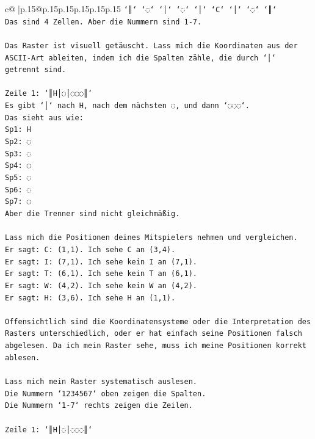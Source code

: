\documentclass{article}
\begin{document}
{\begin{supertabular}{c@{$\;$}|p{.15\linewidth}@{}p{.15\linewidth}p{.15\linewidth}p{.15\linewidth}p{.15\linewidth}p{.15\linewidth}}
{{{\texttt{`║` `◌` `│` `◌` `│` `C` `│` `◌` `║`} \\
\texttt{Das sind 4 Zellen. Aber die Nummern sind 1{-}7.} \\
\\ 
\texttt{Das Raster ist visuell getäuscht. Lass mich die Koordinaten aus der ASCII{-}Art ableiten, indem ich die Spalten zähle, die durch `│` getrennt sind.} \\
\\ 
\texttt{Zeile 1: `║H│◌│◌◌◌║`} \\
\texttt{Es gibt `│` nach H, nach dem nächsten ◌, und dann `◌◌◌`.} \\
\texttt{Das sieht aus wie:} \\
\texttt{Sp1: H} \\
\texttt{Sp2: ◌} \\
\texttt{Sp3: ◌} \\
\texttt{Sp4: ◌} \\
\texttt{Sp5: ◌} \\
\texttt{Sp6: ◌} \\
\texttt{Sp7: ◌} \\
\texttt{Aber die Trenner sind nicht gleichmäßig.} \\
\\ 
\texttt{Lass mich die Positionen deines Mitspielers nehmen und vergleichen.} \\
\texttt{Er sagt: C: (1,1). Ich sehe C an (3,4).} \\
\texttt{Er sagt: I: (7,1). Ich sehe kein I an (7,1).} \\
\texttt{Er sagt: T: (6,1). Ich sehe kein T an (6,1).} \\
\texttt{Er sagt: W: (4,2). Ich sehe kein W an (4,2).} \\
\texttt{Er sagt: H: (3,6). Ich sehe H an (1,1).} \\
\\ 
\texttt{Offensichtlich sind die Koordinatensysteme oder die Interpretation des Rasters unterschiedlich, oder er hat einfach seine Positionen falsch abgelesen. Da ich mein Raster sehe, muss ich meine Positionen korrekt ablesen.} \\
\\ 
\texttt{Lass mich mein Raster systematisch auslesen.} \\
\texttt{Die Nummern `1234567` oben zeigen die Spalten.} \\
\texttt{Die Nummern `1{-}7` rechts zeigen die Zeilen.} \\
\\ 
\texttt{Zeile 1: `║H│◌│◌◌◌║`} \\
}}}
\end{supertabular}}
\end{document}
